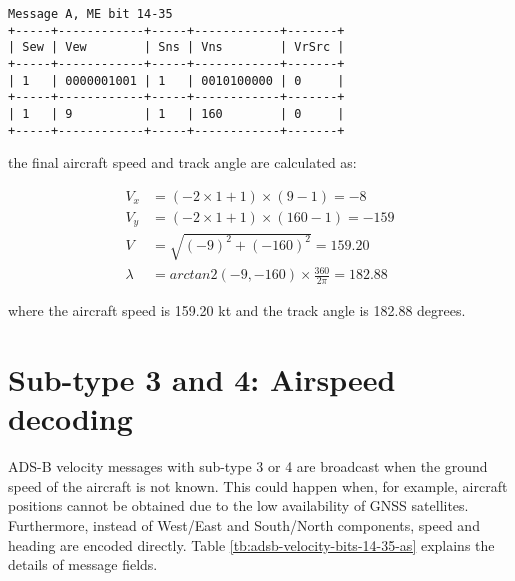 \begin{verbatim}
Message A, ME bit 14-35
+-----+------------+-----+------------+-------+
| Sew | Vew        | Sns | Vns        | VrSrc |
+-----+------------+-----+------------+-------+
| 1   | 0000001001 | 1   | 0010100000 | 0     |
+-----+------------+-----+------------+-------+
| 1   | 9          | 1   | 160        | 0     |
+-----+------------+-----+------------+-------+
\end{verbatim}

the final aircraft speed and track angle are calculated as:

\begin{align}
  V_x &= (-2 \times 1 + 1) \times (9 - 1)  = -8 \\
  V_y &= (-2 \times 1 + 1) \times (160 - 1) = -159 \\
  V &= \sqrt{(-9)^2+ (-160)^2} = 159.20 \\
  \lambda &= arctan2(-9, -160) \times \frac{360}{2\pi} = 182.88
\end{align}

where the aircraft speed is 159.20 kt and the track angle is 182.88 degrees.


\section{Sub-type 3 and 4: Airspeed decoding}

ADS-B velocity messages with sub-type 3 or 4 are broadcast when the ground speed of the aircraft is not known. This could happen when, for example, aircraft positions cannot be obtained due to the low availability of GNSS satellites. Furthermore, instead of West/East and South/North components, speed and heading are encoded directly. Table \ref{tb:adsb-velocity-bits-14-35-as} explains the details of message fields.

